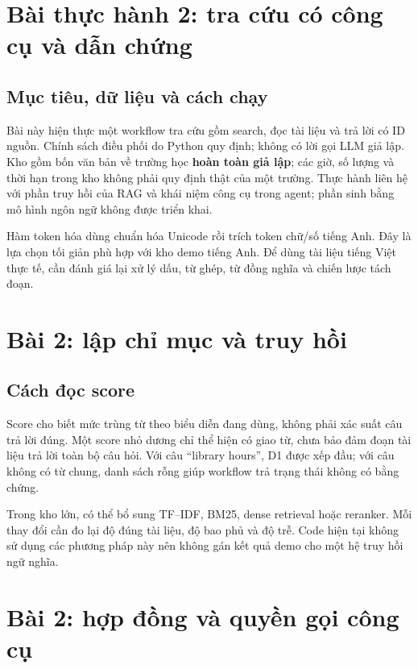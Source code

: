 \newpage
\section{Bài thực hành 2: tra cứu có công cụ và dẫn chứng}
\subsection{Mục tiêu, dữ liệu và cách chạy}
Bài này hiện thực một workflow tra cứu gồm search, đọc tài liệu và trả lời có ID
nguồn. Chính sách điều phối do Python quy định; không có lời gọi LLM giả lập.
Kho gồm bốn văn bản về trường học \textbf{hoàn toàn giả lập}; các giờ, số lượng và
thời hạn trong kho không phải quy định thật của một trường.
Thực hành liên hệ với phần truy hồi của RAG \cite{rag} và khái niệm công cụ trong
agent; phần sinh bằng mô hình ngôn ngữ không được triển khai.


Hàm token hóa dùng chuẩn hóa Unicode rồi trích token chữ/số tiếng Anh. Đây là lựa
chọn tối giản phù hợp với kho demo tiếng Anh. Để dùng tài liệu tiếng Việt thực tế,
cần đánh giá lại xử lý dấu, từ ghép, từ đồng nghĩa và chiến lược tách đoạn.

\newpage
\section*{Bài 2: lập chỉ mục và truy hồi}

\subsection{Cách đọc score}
Score cho biết mức trùng từ theo biểu diễn đang dùng, không phải xác suất câu trả
lời đúng. Một score nhỏ dương chỉ thể hiện có giao từ, chưa bảo đảm đoạn tài liệu
trả lời toàn bộ câu hỏi. Với câu ``library hours'', D1 được xếp đầu; với câu không
có từ chung, danh sách rỗng giúp workflow trả trạng thái không có bằng chứng.

Trong kho lớn, có thể bổ sung TF--IDF, BM25, dense retrieval hoặc reranker. Mỗi thay
đổi cần đo lại độ đúng tài liệu, độ bao phủ và độ trễ. Code hiện tại không sử dụng
các phương pháp này nên không gán kết quả demo cho một hệ truy hồi ngữ nghĩa.

\newpage
\section*{Bài 2: hợp đồng và quyền gọi công cụ}


